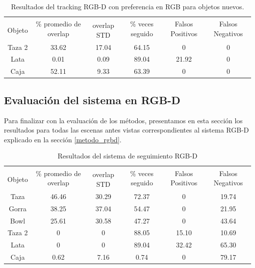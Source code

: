\begin{table}[h]
    \begin{tabular}{|c|c|c|c|c|c|}
    \hline
    & \multirow{2}{2.4cm}{\% promedio de overlap} & & \multirow{2}{2cm}{\% veces seguido} & \multirow{2}{1.6cm}{Falsos Positivos} & \multirow{2}{1.6cm}{Falsos Negativos}\\
	Objeto & & overlap STD & & &\\
    \hline
    Taza 2  & 33.62      & 17.04       & 64.15             & 0                & 0\\
    \hline
    Lata    &  0.01      &  0.09       & 89.04             & 21.92            & 0\\
    \hline
    Caja    & 52.11      &  9.33       & 63.39             & 0                & 0\\
    \hline
    \end{tabular}
\caption{Resultados del tracking RGB-D con preferencia en RGB para objetos nuevos.}
\label{tabla_rgbd_rgb_nuevos}
\end{table}



\subsection{Evaluación del sistema en RGB-D}
Para finalizar con la evaluación de los métodos, presentamos en esta sección los resultados para todas las escenas antes vistas correspondientes al sistema RGB-D explicado en la sección \ref{metodo_rgbd}.

\begin{table}[h]
    \begin{tabular}{|c|c|c|c|c|c|}
    \hline
    & \multirow{2}{2.4cm}{\% promedio de overlap} & & \multirow{2}{2cm}{\% veces seguido} & \multirow{2}{1.6cm}{Falsos Positivos} & \multirow{2}{1.6cm}{Falsos Negativos}\\
	Objeto & & overlap STD & & &\\
	\hline
    Taza    & 46.46      & 30.29       & 72.37             & 0                & 19.74\\
    \hline
    Gorra   & 38.25      & 37.04       & 54.47             & 0                & 21.95\\
    \hline
    Bowl    & 25.61      & 30.58       & 47.27             & 0                & 43.64\\
    \hline
    Taza 2  &     0      &     0       & 88.05             & 15.10            & 10.69\\
    \hline
    Lata    &     0      &     0       & 89.04             & 32.42            & 65.30\\
    \hline
    Caja    &  0.62      &  7.16       &  0.74             & 0                & 79.17\\
    \hline
    \end{tabular}
\caption{Resultados del sistema de seguimiento RGB-D}
\label{tabla_sistema_rgbd}
\end{table}

